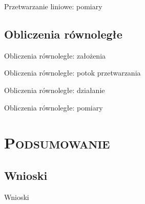 \documentclass[xcolor=x11names,compress]{beamer}
\renewcommand{\(}{\begin{columns}}
\renewcommand{\)}{\end{columns}}
\newcommand{\<}[1]{\begin{column}{#1}}
\renewcommand{\>}{\end{column}}
\begin{document}
\begin{frame}{Przetwarzanie liniowe: pomiary}

\end{frame}


\subsection{Obliczenia równoległe}


\begin{frame}{Obliczenia równoległe: założenia}

\end{frame}


\begin{frame}{Obliczenia równoległe: potok przetwarzania}

\end{frame}



\begin{frame}{Obliczenia równoległe: działanie}

\end{frame}



\begin{frame}{Obliczenia równoległe: pomiary}

\end{frame}

\section{\scshape Podsumowanie}

\subsection*{Wnioski}
\begin{frame}{Wnioski}

\end{frame}
\end{document}
